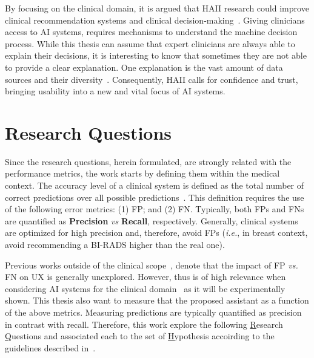 By focusing on the clinical domain, it is argued that \ac{HAII} research could improve clinical recommendation systems and clinical decision-making~\cite{holzinger2019interactive}.
Giving clinicians access to \ac{AI} systems, requires mechanisms to understand the machine decision process.
While this thesis can assume that expert clinicians are always able to explain their decisions, it is interesting to know that sometimes they are not able to provide a clear explanation.
One explanation is the vast amount of data sources and their diversity~\cite{Bharadhwaj:2019:ERS:3308557.3308699, lau2018dataset, price2018big}.
Consequently, \ac{HAII} calls for confidence and trust, bringing usability into a new and vital focus of \ac{AI} systems.

\section{Research Questions}
\label{sec:sec006003}

Since the research questions, herein formulated, are strongly related with the performance metrics, the work starts by defining them within the medical context.
The accuracy level of a clinical system is defined as the total number of correct predictions over all possible predictions~\cite{seref2019performance}.
This definition requires  the use of the following error metrics:
(1) \ac{FP}; and
(2) \ac{FN}.
Typically, both \acp{FP} and \acp{FN} are quantified as {\bf Precision} {\it vs} {\bf Recall}, respectively.
Generally, clinical systems are optimized for high precision and, therefore, avoid \acp{FP} ({\it i.e.}, in breast context, avoid recommending a \ac{BI-RADS} higher than the real one).

Previous works outside of the clinical scope~\cite{Kocielnik:2019:YAI:3290605.3300641, Dove:2017:UDI:3025453.3025739}, denote that the impact of \ac{FP} {\it vs.} \ac{FN} on \ac{UX} is generally unexplored.
However, thus is of high relevance when considering \ac{AI} systems for the clinical domain~\cite{boughey2016identification, dialani2015role} as it will be experimentally shown.
This thesis also want to measure that the proposed assistant as a function of the above metrics.
Measuring predictions are typically quantified as precision in contrast with recall.
Therefore, this work explore the following \underline{R}esearch \underline{Q}uestions and associated each to the set of \underline{H}ypothesis accoirding to the guidelines described in~\cite{10.1145/3290605.3300233, Kocielnik:2019:YAI:3290605.3300641}.

